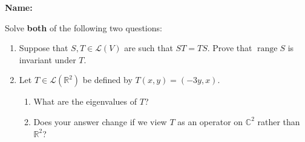 \documentclass[12pt]{article}
\newcommand{\points}[1]{\marginpar{\hspace{24pt}[#1]}}
\newcommand{\R}{\mathbb{R}}
\newcommand{\C}{\mathbb{C}}
\DeclareMathOperator{\range}{range}
\begin{document}
\thispagestyle{fancy}
{\bf Name:}

\bigskip

Solve {\bf both} of the following two questions:
 \begin{enumerate}
 \item Suppose that $S,T\in\mathcal{L}(V)$ are such that $ST=TS$. Prove that $\range S$ is invariant under $T$. \points{5}

\vspace{3in}

 \item Let $T\in\mathcal{L}(\R^2)$ be defined by $T(x,y)=(-3y,x)$.
\begin{enumerate}
 \item What are the eigenvalues of $T$? \points{3}

\vspace{2.5in}
 
 \item Does your answer change if we view $T$ as an operator on $\C^2$ rather than $\R^2$? \points{2}
\end{enumerate}

 \end{enumerate}
\end{document}
